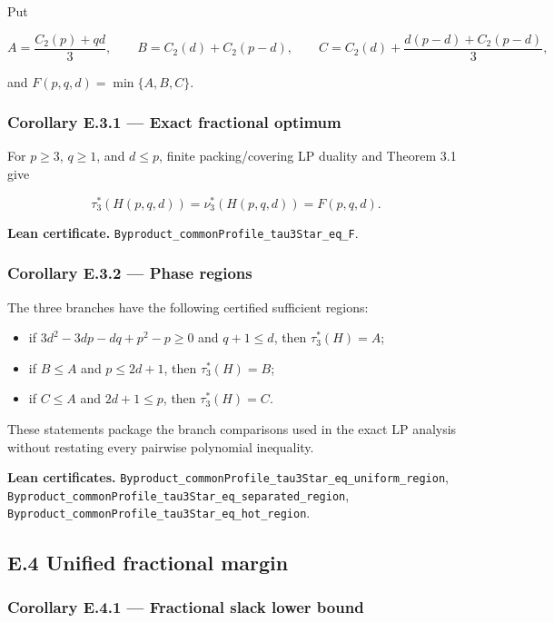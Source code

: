 \documentclass[
  american,
  11pt,
  a4paper,
]{article}
\providecommand{\tightlist}{%
  \setlength{\itemsep}{0pt}\setlength{\parskip}{0pt}}
\begin{document}
Put

\[
A=\frac{C_2(p)+qd}{3},\qquad
B=C_2(d)+C_2(p-d),\qquad
C=C_2(d)+\frac{d(p-d)+C_2(p-d)}{3},
\]

and \(F(p,q,d)=\min\{A,B,C\}\).

\subsubsection{Corollary E.3.1 --- Exact fractional optimum}\label{corollary-e.3.1-exact-fractional-optimum}

For \(p\ge3\), \(q\ge1\), and \(d\le p\), finite packing/covering LP duality and Theorem 3.1 give

\[
\tau_3^*(H(p,q,d))=\nu_3^*(H(p,q,d))=F(p,q,d).
\]

\textbf{Lean certificate.} \texttt{Byproduct\_commonProfile\_tau3Star\_eq\_F}.

\subsubsection{Corollary E.3.2 --- Phase regions}\label{corollary-e.3.2-phase-regions}

The three branches have the following certified sufficient regions:

\begin{itemize}
\tightlist
\item
  if \(3d^2-3dp-dq+p^2-p\ge0\) and \(q+1\le d\), then \(\tau_3^*(H)=A\);
\item
  if \(B\le A\) and \(p\le2d+1\), then \(\tau_3^*(H)=B\);
\item
  if \(C\le A\) and \(2d+1\le p\), then \(\tau_3^*(H)=C\).
\end{itemize}

These statements package the branch comparisons used in the exact LP analysis without restating every pairwise polynomial inequality.

\textbf{Lean certificates.} \texttt{Byproduct\_commonProfile\_tau3Star\_eq\_uniform\_region}, \texttt{Byproduct\_commonProfile\_tau3Star\_eq\_separated\_region}, \texttt{Byproduct\_commonProfile\_tau3Star\_eq\_hot\_region}.

\subsection{E.4 Unified fractional margin}\label{e.4-unified-fractional-margin}

\subsubsection{Corollary E.4.1 --- Fractional slack lower bound}\label{corollary-e.4.1-fractional-slack-lower-bound}
\end{document}
